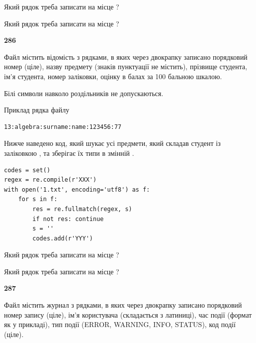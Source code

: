 Який рядок треба записати на місце  ?\par
\vspace{5mm}


Який рядок треба записати на місце  ?\par


\newpage

{\begin {center}\textbf{ 286}\end {center}}\par
Файл  містить відомість з рядками, в яких через двокрапку записано поряд\-ковий номер (ціле), назву предмету (знаків пунктуації не містить), прізвище студента, ім'я студента, номер заліковки, оцінку в балах за 100 бальною шкалою.

Білі символи навколо роздільників не допускаються.

Приклад рядка файлу



\begin{verbatim}
13:algebra:surname:name:123456:77
\end{verbatim}


Нижче наведено код, який шукає усі предмети, який складав студент із заліковкою , та зберігає їх типи в змінній .



\begin{verbatim}
codes = set()
regex = re.compile(r'XXX')
with open('1.txt', encoding='utf8') as f:
    for s in f:
        res = re.fullmatch(regex, s)
        if not res: continue
        s = ''
        codes.add(r'YYY')
\end{verbatim}





Який рядок треба записати на місце  ?\par
\vspace{5mm}


Який рядок треба записати на місце  ?\par


\newpage

{\begin {center}\textbf{ 287}\end {center}}\par
Файл  містить журнал з рядками, в яких через двокрапку записано поряд\-ко\-вий номер запису (ціле), ім'я користувача (складається з латиниці), час події (фор\-мат як у прикладі), тип події (ERROR, WARNING, INFO, STATUS), код події (ціле).

